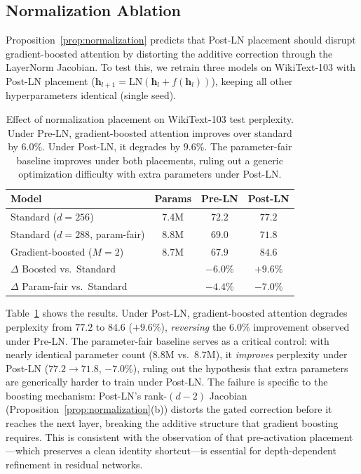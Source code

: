 \documentclass{article}
\theoremstyle{definition}
\begin{document}
\subsection{Normalization Ablation}
\label{sec:norm_ablation}

Proposition~\ref{prop:normalization} predicts that Post-LN placement should disrupt gradient-boosted attention by distorting the additive correction through the LayerNorm Jacobian.
To test this, we retrain three models on WikiText-103 with Post-LN placement ($\mathbf{h}_{l+1} = \mathrm{LN}(\mathbf{h}_l + f(\mathbf{h}_l))$), keeping all other hyperparameters identical (single seed).

\begin{table}[t]
\centering
\caption{Effect of normalization placement on WikiText-103 test perplexity. Under Pre-LN, gradient-boosted attention improves over standard by $6.0\%$. Under Post-LN, it degrades by $9.6\%$. The parameter-fair baseline improves under both placements, ruling out a generic optimization difficulty with extra parameters under Post-LN.}
\label{tab:normalization}
\begin{tabular}{@{}lccc@{}}
\toprule
\textbf{Model} & \textbf{Params} & \textbf{Pre-LN} & \textbf{Post-LN} \\
\midrule
Standard ($d{=}256$)              & 7.4M & $72.2$ & $77.2$ \\
Standard ($d{=}288$, param-fair)  & 8.8M & $69.0$ & $71.8$ \\
Gradient-boosted ($M{=}2$)       & 8.7M & $\mathbf{67.9}$ & $84.6$ \\
\midrule
$\Delta$ Boosted vs.\ Standard   &      & $-6.0\%$ & $+9.6\%$ \\
$\Delta$ Param-fair vs.\ Standard &     & $-4.4\%$ & $-7.0\%$ \\
\bottomrule
\end{tabular}
\end{table}

Table~\ref{tab:normalization} shows the results.
Under Post-LN, gradient-boosted attention degrades perplexity from $77.2$ to $84.6$ ($+9.6\%$), \emph{reversing} the $6.0\%$ improvement observed under Pre-LN.
The parameter-fair baseline serves as a critical control: with nearly identical parameter count ($8.8$M vs.\ $8.7$M), it \emph{improves} perplexity under Post-LN ($77.2 \to 71.8$, $-7.0\%$), ruling out the hypothesis that extra parameters are generically harder to train under Post-LN.
The failure is specific to the boosting mechanism: Post-LN's rank-$(d{-}2)$ Jacobian (Proposition~\ref{prop:normalization}(b)) distorts the gated correction before it reaches the next layer, breaking the additive structure that gradient boosting requires.
This is consistent with the observation of \citet{he2016identity} that pre-activation placement---which preserves a clean identity shortcut---is essential for depth-dependent refinement in residual networks.
\end{document}
